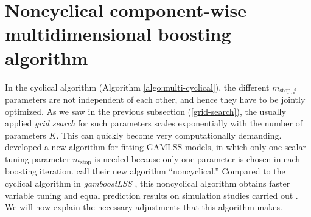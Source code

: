\section{Noncyclical component-wise multidimensional boosting algorithm}
In the cyclical algorithm (Algorithm \ref{algo:multi-cyclical}), the different $m_{\text{stop},j}$ parameters are not independent of each other, and hence they have to be jointly optimized.
As we saw in the previous subsection (\ref{grid-search}), the usually applied \textit{grid search} for such parameters scales exponentially with the number of parameters $K$.
This can quickly become very computationally demanding.
\citet{thomas2018} developed a new algorithm for fitting GAMLSS models, in which only one scalar tuning parameter $m_{\text{stop}}$ is needed because only one parameter is chosen in each boosting iteration.
\citet{thomas2018} call their new algorithm ``noncyclical.''
Compared to the cyclical algorithm in \textit{gamboostLSS} \citep{gamboostlss-paper}, this noncyclical algorithm obtains faster variable tuning and equal prediction results on simulation studies carried out \citep{thomas2018}.
We will now explain the necessary adjustments that this algorithm makes.

